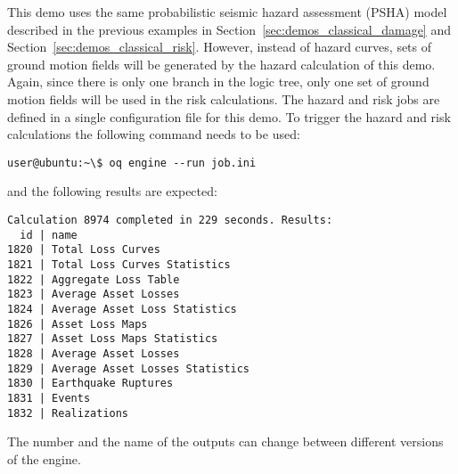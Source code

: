 This demo uses the same probabilistic seismic hazard assessment (PSHA) model
described in the previous examples in Section~\ref{sec:demos_classical_damage}
and Section~\ref{sec:demos_classical_risk}. However, instead of hazard curves,
sets of ground motion fields will be generated by the hazard calculation of
this demo. Again, since there is only one branch in the logic tree, only one
set of ground motion fields will be used in the risk calculations. The hazard
and risk jobs are defined in a single configuration file for this demo. To
trigger the hazard and risk calculations the following command needs to be
used:

\begin{verbatim}
user@ubuntu:~\$ oq engine --run job.ini
\end{verbatim}

and the following results are expected:

\begin{verbatim}
Calculation 8974 completed in 229 seconds. Results:
  id | name
1820 | Total Loss Curves
1821 | Total Loss Curves Statistics
1822 | Aggregate Loss Table
1823 | Average Asset Losses
1824 | Average Asset Loss Statistics
1826 | Asset Loss Maps
1827 | Asset Loss Maps Statistics
1828 | Average Asset Losses
1829 | Average Asset Losses Statistics
1830 | Earthquake Ruptures
1831 | Events
1832 | Realizations
\end{verbatim}

The number and the name of the outputs can change between
different versions of the engine.
